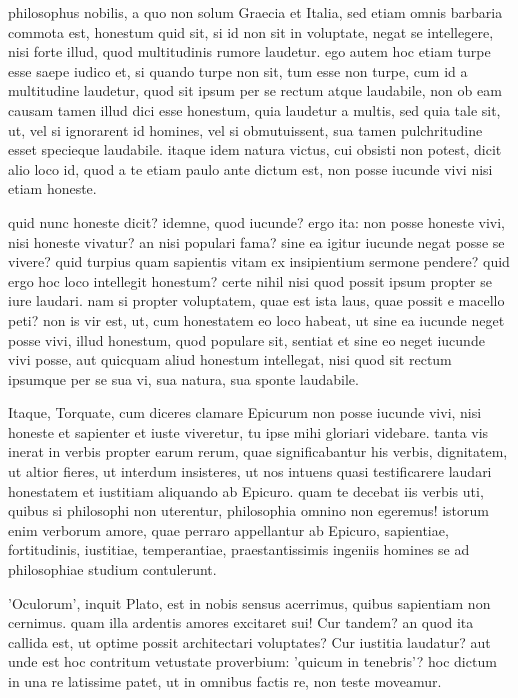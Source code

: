  philosophus nobilis, a quo non solum Graecia et Italia, sed etiam omnis barbaria commota est, honestum quid sit, si id non sit in voluptate, negat se intellegere, nisi forte illud, quod multitudinis rumore laudetur. ego autem hoc etiam turpe esse saepe iudico et, si quando turpe non sit, tum esse non turpe, cum id a multitudine laudetur, quod sit ipsum per se rectum atque laudabile, non ob eam causam tamen illud dici esse honestum, quia laudetur a multis, sed quia tale sit, ut, vel si ignorarent id homines, vel si obmutuissent, sua tamen pulchritudine esset specieque laudabile. itaque idem natura victus, cui obsisti non potest, dicit alio loco id, quod a te etiam paulo ante dictum est, non posse iucunde vivi nisi etiam honeste.

 quid nunc honeste dicit? idemne, quod iucunde? ergo ita: non posse honeste vivi, nisi honeste vivatur? an nisi populari fama? sine ea igitur iucunde negat posse se vivere? quid turpius quam sapientis vitam ex insipientium sermone pendere? quid ergo hoc loco intellegit honestum? certe nihil nisi quod possit ipsum propter se iure laudari. nam si propter voluptatem, quae est ista laus, quae possit e macello peti? non is vir est, ut, cum honestatem eo loco habeat, ut sine ea iucunde neget posse vivi, illud honestum, quod populare sit, sentiat et sine eo neget iucunde vivi posse, aut quicquam aliud honestum intellegat, nisi quod sit rectum ipsumque per se sua vi, sua natura, sua sponte laudabile.

 Itaque, Torquate, cum diceres clamare Epicurum non posse iucunde vivi, nisi honeste et sapienter et iuste viveretur, tu ipse mihi gloriari videbare. tanta vis inerat in verbis propter earum rerum, quae significabantur his verbis, dignitatem, ut altior fieres, ut interdum insisteres, ut nos intuens quasi testificarere laudari honestatem et iustitiam aliquando ab Epicuro. quam te decebat iis verbis uti, quibus si philosophi non uterentur, philosophia omnino non egeremus! istorum enim verborum amore, quae perraro appellantur ab Epicuro, sapientiae, fortitudinis, iustitiae, temperantiae, praestantissimis ingeniis homines se ad philosophiae studium contulerunt.

 'Oculorum', inquit Plato, est in nobis sensus acerrimus, quibus sapientiam non cernimus. quam illa ardentis amores excitaret sui! Cur tandem? an quod ita callida est, ut optime possit architectari voluptates? Cur iustitia laudatur? aut unde est hoc contritum vetustate proverbium: 'quicum in tenebris'? hoc dictum in una re latissime patet, ut in omnibus factis re, non teste moveamur.

